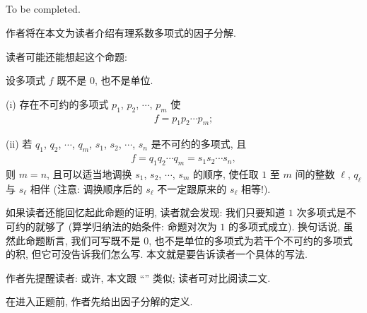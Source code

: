 \subsection*{\FactorizationOfPolynomialsOverQ}
\markright{\FactorizationOfPolynomialsOverQ}

To be completed.

作者将在本文为读者介绍有理系数多项式的因子分解.

读者可能还能想起这个命题:
\begin{proposition}
    设多项式 $f$ 既不是 $0$, 也不是单位.

    (i) 存在不可约的多项式 $p_1$, $p_2$, $\cdots$, $p_m$ 使
    \begin{align*}
        f = p_1 p_2 \cdots p_m;
    \end{align*}

    (ii) 若 $q_1$, $q_2$, $\cdots$, $q_m$, $s_1$, $s_2$, $\cdots$, $s_n$ 是不可约的多项式, 且
    \begin{align*}
        f = q_1 q_2 \cdots q_m = s_1 s_2 \cdots s_n,
    \end{align*}
    则 $m = n$, 且可以适当地调换 $s_1$, $s_2$, $\cdots$, $s_m$ 的顺序, 使任取 $1$ 至 $m$ 间的整数 $\ell$, $q_\ell$ 与 $s_\ell$ 相伴 (注意: 调换顺序后的 $s_\ell$ 不一定跟原来的 $s_\ell$ 相等!).
\end{proposition}

如果读者还能回忆起此命题的证明, 读者就会发现: 我们只要知道 $1$ 次多项式是不可约的就够了 (算学归纳法的始条件: 命题对次为 $1$ 的多项式成立). 换句话说, 虽然此命题断言, 我们可写既不是 $0$, 也不是单位的多项式为若干个不可约的多项式的积, 但它可没告诉我们怎么写. 本文就是要告诉读者一个具体的写法.

作者先提醒读者: 或许, 本文跟 ``\FactorizationOfIntegers '' 类似; 读者可对比阅读二文.

在进入正题前, 作者先给出因子分解的定义.

